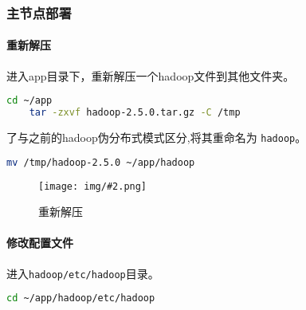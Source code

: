 \documentclass{article}
\newcommand{\img}[3][0.9]{%
    \begin{figure}[H]
        \centering
        \texttt{[image: img/\#2.png]}
        \caption{#3}
    \end{figure}
}
\newcommand{\subsubsubsection}[1]{\paragraph{#1}\mbox{}}
\begin{document}
\subsubsection{主节点部署}

\subsubsubsection{重新解压}

进入app目录下，重新解压一个hadoop文件到其他文件夹。

\begin{lstlisting}[language=bash]
    cd ~/app
    tar -zxvf hadoop-2.5.0.tar.gz -C /tmp
\end{lstlisting}

了与之前的hadoop伪分布式模式区分,将其重命名为 \texttt{hadoop}。

\begin{lstlisting}[language=bash]
    mv /tmp/hadoop-2.5.0 ~/app/hadoop
\end{lstlisting}

\img{7.1.1.1}{重新解压}

\subsubsubsection{修改配置文件}

进入\texttt{hadoop/etc/hadoop}目录。

\begin{lstlisting}[language=bash]
    cd ~/app/hadoop/etc/hadoop
\end{lstlisting}
\end{document}

